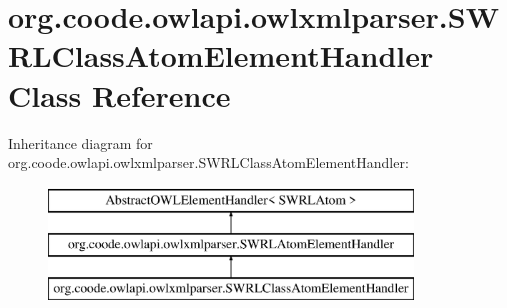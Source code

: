 \hypertarget{classorg_1_1coode_1_1owlapi_1_1owlxmlparser_1_1_s_w_r_l_class_atom_element_handler}{\section{org.\-coode.\-owlapi.\-owlxmlparser.\-S\-W\-R\-L\-Class\-Atom\-Element\-Handler Class Reference}
\label{classorg_1_1coode_1_1owlapi_1_1owlxmlparser_1_1_s_w_r_l_class_atom_element_handler}
}
Inheritance diagram for org.\-coode.\-owlapi.\-owlxmlparser.\-S\-W\-R\-L\-Class\-Atom\-Element\-Handler\-:\begin{figure}[H]
\begin{center}
\leavevmode
\includegraphics[height=3.000000cm]{classorg_1_1coode_1_1owlapi_1_1owlxmlparser_1_1_s_w_r_l_class_atom_element_handler}
\end{center}
\end{figure}
